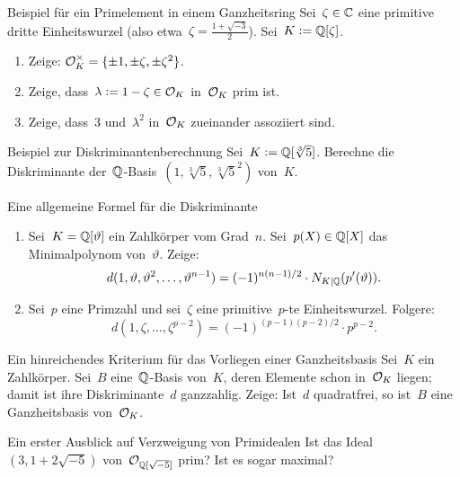 \documentclass{uebblatt}
\begin{document}

\begin{aufgabe}{Beispiel für ein Primelement in einem Ganzheitsring}
Sei~$\zeta \in \mathbb{C}$ eine primitive dritte Einheitswurzel (also etwa~$\zeta =
\frac{1+\sqrt{-3}}{2}$). Sei~$K \vcentcolon= \mathbb{Q}[\zeta]$.
\begin{enumerate}
\item Zeige: $\mathcal{O}_K^\times = \{ \pm 1, \pm \zeta, \pm \zeta^2 \}$.
\item Zeige, dass~$\lambda \vcentcolon= 1 - \zeta \in \mathcal{O}_K$ in~$\mathcal{O}_K$ prim ist.
\item Zeige, dass~$3$ und~$\lambda^2$ in~$\mathcal{O}_K$ zueinander assoziiert sind.
\end{enumerate}
\end{aufgabe}

\begin{aufgabe}{Beispiel zur Diskriminantenberechnung}
Sei~$K \vcentcolon= \mathbb{Q}[\sqrt[3]{5}]$. Berechne die Diskriminante
der~$\mathbb{Q}$-Basis~$(1,\sqrt[3]{5},\sqrt[3]{5}^2)$ von~$K$.
\end{aufgabe}

\begin{aufgabe}{Eine allgemeine Formel für die Diskriminante}
\begin{enumerate}
\item Sei~$K = \mathbb{Q}[\vartheta]$ ein Zahlkörper vom Grad~$n$. Sei~$p(X) \in \mathbb{Q}[X]$ das
Minimalpolynom von~$\vartheta$. Zeige:
\[ d(1,\vartheta,\vartheta^2,\ldots,\vartheta^{n-1}) =
  (-1)^{n(n-1)/2} \cdot N_{K|\mathbb{Q}}(p'(\vartheta)). \]
\item Sei~$p$ eine Primzahl und sei~$\zeta$ eine primitive~$p$-te
Einheitswurzel. Folgere:
\[ d(1,\zeta,\ldots,\zeta^{p-2}) =
  (-1)^{(p-1)(p-2)/2} \cdot p^{p-2}. \]
\end{enumerate}
\vspace*{-1em}
\end{aufgabe}

\begin{aufgabe}{Ein hinreichendes Kriterium für das Vorliegen einer Ganzheitsbasis}
Sei~$K$ ein Zahlkörper. Sei~$B$ eine~$\mathbb{Q}$-Basis von~$K$, deren Elemente schon
in~$\mathcal{O}_K$ liegen; damit ist ihre Diskriminante~$d$ ganzzahlig. Zeige: Ist~$d$
quadratfrei, so ist~$B$ eine Ganzheitsbasis von~$\mathcal{O}_K$.
\end{aufgabe}

\begin{aufgabe}{Ein erster Ausblick auf Verzweigung von Primidealen}
Ist das Ideal~$(3, 1+2\sqrt{-5})$ von~$\mathcal{O}_{\mathbb{Q}[\sqrt{-5}]}$ prim? Ist es sogar
maximal?
\end{aufgabe}
\end{document}
